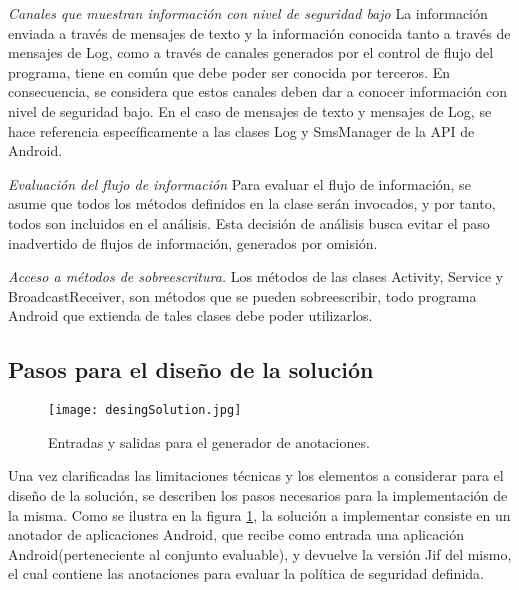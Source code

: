 \textit{Canales que muestran información con nivel de seguridad bajo}\newline
La información enviada a través de mensajes de texto y la información conocida
tanto a través de mensajes de Log, como a través de canales generados por el
control de flujo del programa, tiene en común que debe poder ser conocida por
terceros. En consecuencia, se considera que estos canales deben dar a conocer
información con nivel de seguridad bajo.\newline
En el caso de mensajes de texto y mensajes de Log, se hace referencia
específicamente a las clases Log y SmsManager de la API de Android.

\textit{Evaluación del flujo de información}\newline
Para evaluar el flujo de información, se asume que todos los métodos definidos
en la clase serán invocados, y por tanto, todos son incluidos en el análisis.\newline 
Esta decisión de análisis busca evitar el paso inadvertido de flujos de
información, generados por omisión.

\textit{Acceso a métodos de sobreescritura.}\newline
Los métodos de las clases Activity, Service y BroadcastReceiver, son métodos
que se pueden sobreescribir, todo programa Android que extienda de tales clases
debe poder utilizarlos.


\subsection{Pasos para el diseño de la solución}
\begin{figure}[t!]
	\begin{center}
	\texttt{[image: desingSolution.jpg]}
	\end{center}
	\caption{Entradas y salidas para el generador de anotaciones.}
	\label{fig:desingSolution} 
\end{figure}
Una vez clarificadas las limitaciones técnicas y los elementos a considerar para
el diseño de la solución, se describen los pasos necesarios para la
implementación de la misma. Como se ilustra en la figura
\ref{fig:desingSolution}, la solución a implementar consiste en un anotador de
aplicaciones Android, que recibe como entrada una aplicación
Android(perteneciente al conjunto evaluable), y devuelve la versión Jif del
mismo, el cual contiene las anotaciones para evaluar la política de seguridad
definida.\newline

